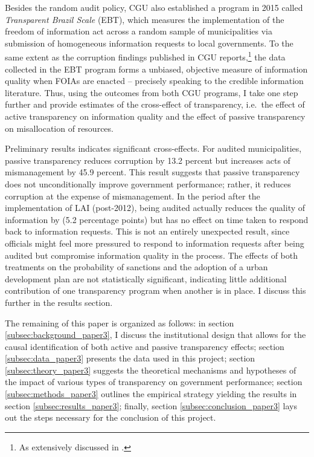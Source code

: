 \documentclass[11pt]{article}
\begin{document}
Besides the random audit policy, CGU also established a program in 2015 called \emph{Transparent Brazil Scale} (EBT), which measures the implementation of the freedom of information act across a random sample of municipalities via submission of homogeneous information requests to local governments. To the same extent as the corruption findings published in CGU reports,\footnote{As extensively discussed in \citet{FerrazExposingCorruptPoliticians2008b,FerrazElectoralAccountabilityCorruption2011a,BrolloPoliticalResourceCurse2013,ZamboniAuditRiskRent2018,AvisGovernmentAuditsReduce2018}.} the data collected in the EBT program forms a unbiased, objective measure of information quality when FOIAs are enacted -- precisely speaking to the credible information literature. Thus, using the outcomes from both CGU programs, I take one step further and provide estimates of the cross-effect of transparency, i.e.~the effect of active transparency on information quality and the effect of passive transparency on misallocation of resources.

Preliminary results indicates significant cross-effects. For audited municipalities, passive transparency reduces corruption by 13.2 percent but increases acts of mismanagement by 45.9 percent. This result suggests that passive transparency does not unconditionally improve government performance; rather, it reduces corruption at the expense of mismanagement. In the period after the implementation of LAI (post-2012), being audited actually reduces the quality of information by (5.2 percentage points) but has no effect on time taken to respond back to information requests. This is not an entirely unexpected result, since officials might feel more pressured to respond to information requests after being audited but compromise information quality in the process. The effects of both treatments on the probability of sanctions and the adoption of a urban development plan are not statistically significant, indicating little additional contribution of one transparency program when another is in place. I discuss this further in the results section.

The remaining of this paper is organized as follows: in section \ref{subsec:background_paper3}, I discuss the institutional design that allows for the causal identification of both active and passive transparency effects; section \ref{subsec:data_paper3} presents the data used in this project; section \ref{subsec:theory_paper3} suggests the theoretical mechanisms and hypotheses of the impact of various types of transparency on government performance; section \ref{subsec:methods_paper3} outlines the empirical strategy yielding the results in section \ref{subsec:results_paper3}; finally, section \ref{subsec:conclusion_paper3} lays out the steps necessary for the conclusion of this project.
\end{document}
